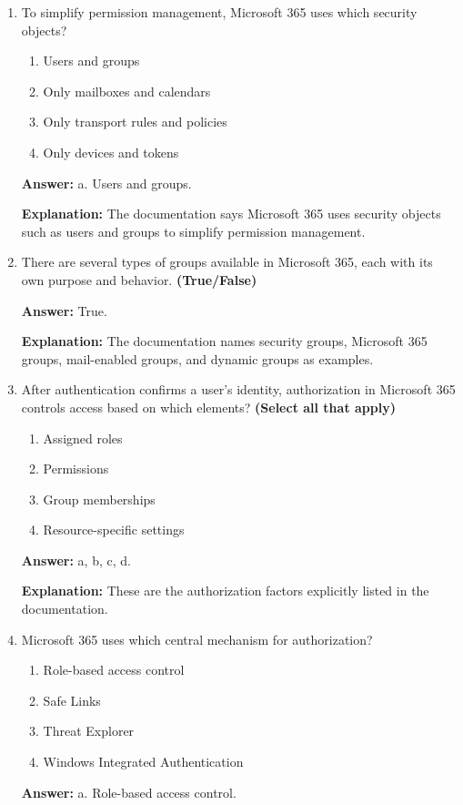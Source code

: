 \documentclass[10pt]{article}
\begin{document}
\begin{enumerate}[leftmargin=*]
\textbf{Explanation:} All four are explicitly listed in the opening section of the documentation.

\item To simplify permission management, Microsoft 365 uses which security objects?
\begin{enumerate}[label=\alph*., leftmargin=1.5em]
\item Users and groups
\item Only mailboxes and calendars
\item Only transport rules and policies
\item Only devices and tokens
\end{enumerate}
\textbf{Answer:} a. Users and groups.

\textbf{Explanation:} The documentation says Microsoft 365 uses security objects such as users and groups to simplify permission management.

\item There are several types of groups available in Microsoft 365, each with its own purpose and behavior. \textbf{(True/False)}

\textbf{Answer:} True.

\textbf{Explanation:} The documentation names security groups, Microsoft 365 groups, mail-enabled groups, and dynamic groups as examples.

\item After authentication confirms a user’s identity, authorization in Microsoft 365 controls access based on which elements? \textbf{(Select all that apply)}
\begin{enumerate}[label=\alph*., leftmargin=1.5em]
\item Assigned roles
\item Permissions
\item Group memberships
\item Resource-specific settings
\end{enumerate}
\textbf{Answer:} a, b, c, d.

\textbf{Explanation:} These are the authorization factors explicitly listed in the documentation.

\item Microsoft 365 uses which central mechanism for authorization?
\begin{enumerate}[label=\alph*., leftmargin=1.5em]
\item Role-based access control
\item Safe Links
\item Threat Explorer
\item Windows Integrated Authentication
\end{enumerate}
\textbf{Answer:} a. Role-based access control.


\end{enumerate}
\end{document}
